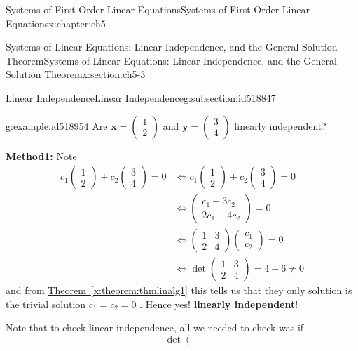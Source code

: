 \documentclass[oneside,10pt,]{book}
\newcommand{\xreffont}{\relax}
\newcommand{\terminology}[1]{\textbf{#1}}
\numberwithin{equation}{section}
\numberwithin{equation}{section}
\newcommand{\amp}{&}
\begin{document}
\begin{chapterptx}{Systems of First Order Linear Equations}{}{Systems of First Order Linear Equations}{}{}{x:chapter:ch5}
\begin{sectionptx}{Systems of Linear Equations: Linear Independence, and the General Solution Theorem}{}{Systems of Linear Equations: Linear Independence, and the General Solution Theorem}{}{}{x:section:ch5-3}
\begin{subsectionptx}{Linear Independence}{}{Linear Independence}{}{}{g:subsection:id518847}
\begin{example}{}{g:example:id518954}
Are \(\mathbf{x}=\left(\begin{array}{c}
1\\
2
\end{array}\right)\) and \(\mathbf{y}=\left(\begin{array}{c}
3\\
4
\end{array}\right)\) linearly independent?%
\par
\terminology{Method1:} Note%
\begin{align*}
c_{1}\left(\begin{array}{c}
1\\
2
\end{array}\right)+c_{2}\left(\begin{array}{c}
3\\
4
\end{array}\right)=0 \amp \iff c_{1}\left(\begin{array}{c}
1\\
2
\end{array}\right)+c_{2}\left(\begin{array}{c}
3\\
4
\end{array}\right)=0\\
\amp \iff  \left(\begin{array}{c}
c_{1}+3c_{2}\\
2c_{1}+4c_{2}
\end{array}\right)=0\\
\amp \iff \left(\begin{array}{cc}
1 \amp 3\\
2 \amp 4
\end{array}\right)\left(\begin{array}{c}
c_{1}\\
c_{2}
\end{array}\right)=0\\
\amp \iff  \det\left(\begin{array}{cc}
1 \amp 3\\
2 \amp 4
\end{array}\right)=4-6\neq 0
\end{align*}
and from \hyperref[x:theorem:thmlinalg1]{Theorem~{\xreffont\ref{x:theorem:thmlinalg1}}} this tells us that they only solution is the trivial solution \(c_{1}=c_{2}=0\) . Hence yes! \terminology{linearly independent}!%
\par
Note that to check linear independence, all we needed to check was if%
\begin{equation*}
\det\left(\begin{array}{cc}

\end{array}
\end{equation*}
\end{example}
\end{subsectionptx}
\end{sectionptx}
\end{chapterptx}
\end{document}
